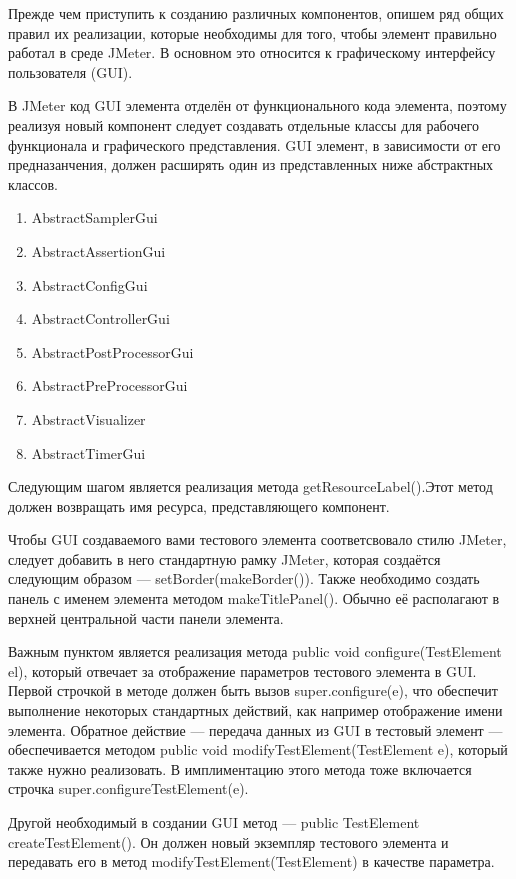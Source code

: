 Прежде чем приступить к созданию различных компонентов, опишем ряд общих правил их реализации,
которые необходимы для того, чтобы элемент правильно работал в среде JMeter. В основном это относится к
графическому интерфейсу пользователя (GUI).

В JMeter код GUI элемента отделён от функционального кода элемента, поэтому реализуя новый компонент следует
создавать отдельные классы для рабочего функционала и графического представления. GUI элемент, в зависимости
 от его предназанчения, должен расширять один из представленных ниже абстрактных классов.

\begin{enumerate}
\item AbstractSamplerGui
\item AbstractAssertionGui
\item AbstractConfigGui
\item AbstractControllerGui
\item AbstractPostProcessorGui
\item AbstractPreProcessorGui
\item AbstractVisualizer
\item AbstractTimerGui
\end{enumerate}

Следующим шагом является реализация метода getResourceLabel().Этот метод должен возвращать имя ресурса,
представляющего компонент.

Чтобы GUI создаваемого вами тестового элемента соответсвовало стилю JMeter, следует добавить в него стандартную
рамку JMeter, которая создаётся следующим образом --- setBorder(makeBorder()). Также необходимо создать
панель с именем элемента методом makeTitlePanel(). Обычно её располагают в верхней центральной части панели
элемента.

Важным пунктом является реализация метода public void configure(TestElement el), который отвечает за отображение
параметров тестового элемента в GUI. Первой строчкой в методе должен быть вызов super.configure(e), что обеспечит
выполнение некоторых стандартных действий, как например отображение имени элемента. Обратное действие ---
передача данных из GUI в тестовый элемент --- обеспечивается методом public void modifyTestElement(TestElement e),
который также нужно реализовать. В имплиментацию этого метода тоже включается строчка
super.configureTestElement(e).

Другой необходимый в создании GUI метод --- public TestElement createTestElement(). Он должен новый экземпляр
тестового элемента и передавать его в метод modifyTestElement(TestElement) в качестве параметра.


